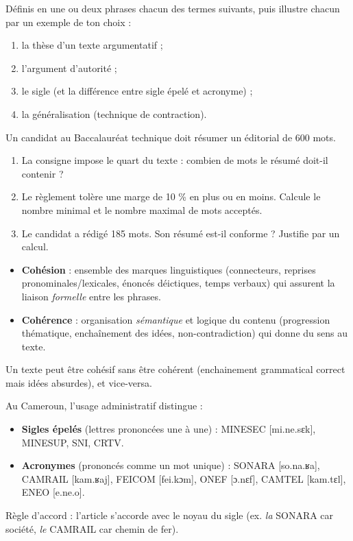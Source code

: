 \documentclass[11pt]{article}
\newcommand{\cle}[1]{{\popxbold\color{popdark}#1}}
\newcounter{popsec}
\newcounter{popsub}
\newcommand{\courssub}[1]{%
  \stepcounter{popsub}%
  \par\vspace{9pt}\noindent{\popxbold\fontsize{11.5}{13}\selectfont\color{popink}{\color{poporange}\thepopsec.\thepopsub}\hspace{6pt}#1}\par\nopagebreak\vspace{4pt}
}
\begin{document}
\begin{exercice}[Définitions]
Définis en une ou deux phrases chacun des termes suivants, puis illustre chacun par un exemple de ton choix :
\begin{enumerate}
\item la thèse d'un texte argumentatif ;
\item l'argument d'autorité ;
\item le sigle (et la différence entre sigle épelé et acronyme) ;
\item la généralisation (technique de contraction).
\end{enumerate}
\end{exercice}

\begin{exercice}
Un candidat au Baccalauréat technique doit résumer un éditorial de 600 mots.
\begin{enumerate}
\item La consigne impose le quart du texte : combien de mots le résumé doit-il contenir ?
\item Le règlement tolère une marge de 10 \% en plus ou en moins. Calcule le nombre minimal et le nombre maximal de mots acceptés.
\item Le candidat a rédigé 185 mots. Son résumé est-il conforme ? Justifie par un calcul.
\end{enumerate}
\end{exercice}

\courssub{Je m'entraîne}

\begin{aretenir}
\begin{itemize}
\item \textbf{Cohésion} : ensemble des marques linguistiques (connecteurs, reprises pronominales/lexicales, énoncés déictiques, temps verbaux) qui assurent la liaison \emph{formelle} entre les phrases.
\item \textbf{Cohérence} : organisation \emph{sémantique} et logique du contenu (progression thématique, enchaînement des idées, non-contradiction) qui donne du sens au texte.
\end{itemize}
Un texte peut être cohésif sans être cohérent (enchainement grammatical correct mais idées absurdes), et vice-versa.
\end{aretenir}

\begin{savaistu}
Au Cameroun, l'usage administratif distingue :
\begin{itemize}
\item \textbf{Sigles épelés} (lettres prononcées une à une) : \cle{MINESEC} [mi.ne.sɛk], \cle{MINESUP}, \cle{SNI}, \cle{CRTV}.
\item \textbf{Acronymes} (prononcés comme un mot unique) : \cle{SONARA} [so.na.ʁa], \cle{CAMRAIL} [kam.ʁaj], \cle{FEICOM} [fei.kɔm], \cle{ONEF} [ɔ.nɛf], \cle{CAMTEL} [kam.tɛl], \cle{ENEO} [e.ne.o].
\end{itemize}
Règle d'accord : l'article s'accorde avec le noyau du sigle (ex. \emph{la} SONARA car société, \emph{le} CAMRAIL car chemin de fer).
\end{savaistu}
\end{document}

